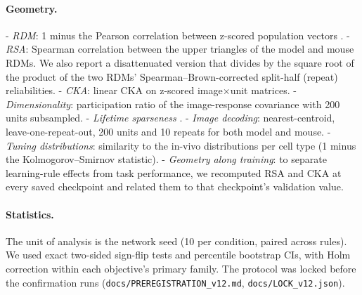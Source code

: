 \paragraph{Geometry.}
- \emph{RDM}: 1 minus the Pearson correlation between z-scored population vectors
  \citep{kriegeskorte2008rsa}.
- \emph{RSA}: Spearman correlation between the upper triangles of the model and mouse RDMs. We also
  report a disattenuated version that divides by the square root of the product of the two RDMs'
  Spearman--Brown-corrected split-half (repeat) reliabilities.
- \emph{CKA}: linear CKA \citep{kornblith2019cka} on z-scored image$\times$unit matrices.
- \emph{Dimensionality}: participation ratio of the image-response covariance with 200 units
  subsampled.
- \emph{Lifetime sparseness} \citep{vinje2000}.
- \emph{Image decoding}: nearest-centroid, leave-one-repeat-out, 200 units and 10 repeats for both
  model and mouse.
- \emph{Tuning distributions}: similarity to the in-vivo distributions per cell type (1 minus the
  Kolmogorov--Smirnov statistic).
- \emph{Geometry along training}: to separate learning-rule effects from task performance, we
  recomputed RSA and CKA at every saved checkpoint and related them to that checkpoint's
  validation value.

\paragraph{Statistics.} The unit of analysis is the network seed (10 per condition, paired across
rules). We used exact two-sided sign-flip tests and percentile bootstrap CIs, with Holm correction
within each objective's primary family. The protocol was locked before the confirmation runs
(\texttt{docs/PREREGISTRATION\_v12.md}, \texttt{docs/LOCK\_v12.json}).
